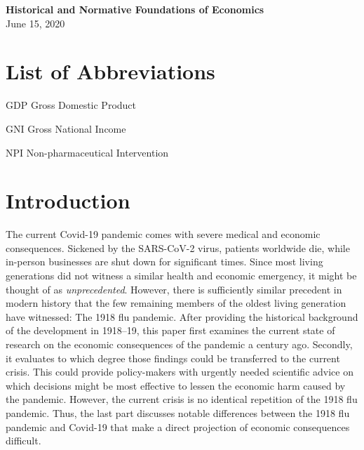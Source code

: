 \documentclass[12pt,a4paper]{article}
\begin{document}
\begin{center}
  \textbf{Historical and Normative Foundations of Economics} \\\vspace{0.5cm}
  June 15, 2020
  
\end{center}


\pagebreak
\pagestyle{plain}
\tableofcontents
\pagebreak
\listoffigures
\newpage
{}
 
\section*{List of Abbreviations}
 
\begin{abbrv}
 
\item[GDP]			Gross Domestic Product
\item[GNI]			Gross National Income
\item[NPI]			Non-pharmaceutical Intervention

\end{abbrv}
\newpage
\setcounter{page}{2}
\setlength{\baselineskip}{1.5\baselineskip}
\pagestyle{plain}


\section{Introduction}


The current Covid-19 pandemic comes with severe medical and economic consequences.
Sickened by the SARS-CoV-2 virus, patients worldwide die, while in-person businesses are shut down for significant times.
Since most living generations did not witness a similar health and economic emergency, it might be thought of as \textit{unprecedented}.
However, there is sufficiently similar precedent in modern history that the few remaining members of the oldest living generation have witnessed: The 1918 flu pandemic.
After providing the historical background of the development in 1918--19, this paper first examines the current state of research on the economic consequences of the pandemic a century ago.
Secondly, it evaluates to which degree those findings could be transferred to the current crisis.
This could provide policy-makers with urgently needed scientific advice on which decisions might be most effective to lessen the economic harm caused by the pandemic.
However, the current crisis is no identical repetition of the 1918 flu pandemic.
Thus, the last part discusses notable differences between the 1918 flu pandemic and Covid-19 that make a direct projection of economic consequences difficult.
\end{document}
